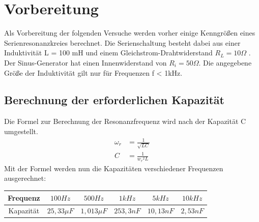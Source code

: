 \documentclass{article}
\begin{document}
\newpage
\thispagestyle{empty}

\tableofcontents


\newpage


\section{Vorbereitung}
Als Vorbereitung der folgenden Versuche werden vorher einige Kenngrößen eines Serienresonanzkreies berechnet.
Die Serienschaltung besteht dabei aus einer Induktivität L = 100 mH und einem Gleichstrom-Drahtwiderstand $R_L = 10 \Omega$ . Der Sinus-Generator
hat einen Innenwiderstand von $R_i = 50\Omega$. Die angegebene Größe der Induktivität gilt nur für Frequenzen f < 1kHz.

\subsection{Berechnung der erforderlichen Kapazität}
Die Formel zur Berechnung der Resonanzfrequenz wird nach der Kapazität C umgestellt.
\begin{align*}
  \omega_r & = \frac{1}{\sqrt{LC}} \\
  C        & = \frac{1}{{w_r}^2L}
\end{align*}
Mit der Formel werden nun die Kapazitäten verschiedener Frequenzen ausgerechnet:
\begin{table}[h]
  \begin{center}
    \begin{tabular}{|c|c|c|c|c|c|}
      \hline
      Frequenz  & $100 Hz$     & $500Hz$      & $1kHz$    & $5kHz$    & $10kHz$  \\
      \hline
      Kapazität & $25,33\mu F$ & $1,013\mu F$ & $253,3nF$ & $10,13nF$ & $2,53nF$ \\
      \hline
    \end{tabular}

  \end{center}
\end{table}
\end{document}
